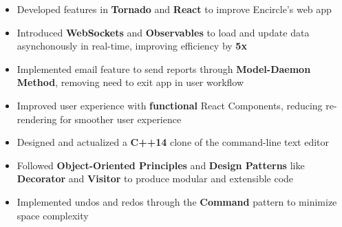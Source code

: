 \documentclass[10pt,a4paper,ragged2e]{altacv}
\begin{document}

\begin{fullwidth}
    \makecvheader
\end{fullwidth}




\begin{itemize}
    \item Developed features in \textbf{Tornado} and \textbf{React} to improve Encircle's web app
    \item Introduced \textbf{WebSockets} and \textbf{Observables} to load and update data asynchonously in real-time, improving efficiency by \textbf{5x}
    \item Implemented email feature to send reports through \textbf{Model-Daemon Method}, removing need to exit app in user workflow
    \item Improved user experience with \textbf{functional} React Components, reducing re-rendering for smoother user experience 
\end{itemize}


\begin{itemize}
    \item Designed and actualized a \textbf{C++14} clone of the command-line text editor
    \item Followed \textbf{Object-Oriented Principles} and \textbf{Design Patterns} like \textbf{Decorator} and \textbf{Visitor} to produce modular and extensible code
    \item Implemented undos and redos through the \textbf{Command} pattern to minimize space complexity
\end{itemize}
\end{document}
